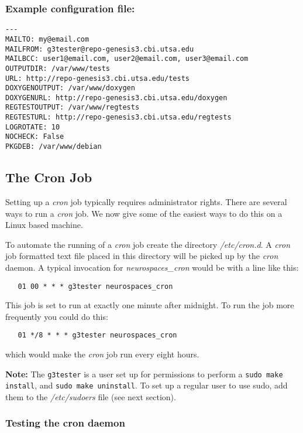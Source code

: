 \documentclass[12pt]{article}
\begin{document}
\subsubsection*{Example configuration file:}

\begin{verbatim}
---
MAILTO: my@email.com
MAILFROM: g3tester@repo-genesis3.cbi.utsa.edu
MAILBCC: user1@email.com, user2@email.com, user3@email.com
OUTPUTDIR: /var/www/tests
URL: http://repo-genesis3.cbi.utsa.edu/tests
DOXYGENOUTPUT: /var/www/doxygen
DOXYGENURL: http://repo-genesis3.cbi.utsa.edu/doxygen
REGTESTOUTPUT: /var/www/regtests
REGTESTURL: http://repo-genesis3.cbi.utsa.edu/regtests
LOGROTATE: 10
NOCHECK: False
PKGDEB: /var/www/debian

\end{verbatim}

\subsection*{The Cron Job}

Setting up a {\it cron} job typically requires administrator rights. There are several ways to run a {\it cron} job. We now give some of the easiest ways to do this on a Linux based machine.

To automate the running of a {\it cron} job create the directory {\it /etc/cron.d}. A {\it cron} job formatted text file placed in this directory will be picked up by the {\it cron} daemon. A typical invocation for {\it neurospaces\_cron} would be with a line like this:
\begin{verbatim}
   01 00 * * * g3tester neurospaces_cron
\end{verbatim}
This job is set to run at exactly one minute after midnight. To run the job more frequently you could do this:
\begin{verbatim}
   01 */8 * * * g3tester neurospaces_cron
\end{verbatim}
which would make the {\it cron} job run every eight hours.

{\bf Note:} The {\tt g3tester} is a user set up for permissions to perform a {\tt sudo make install}, and {\tt sudo make uninstall}. To set up a regular user to use sudo, add them to the {\it /etc/sudoers} file (see next section).

\subsubsection*{Testing the cron daemon}
\end{document}
